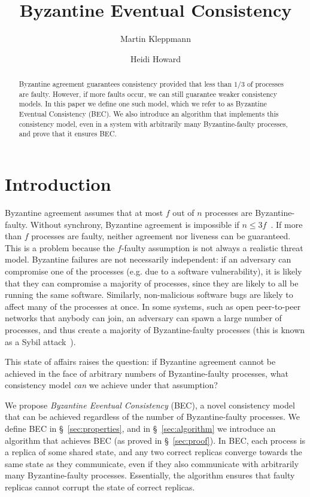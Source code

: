 \documentclass[a4paper,anonymous,USenglish]{lipics-v2019}
\title{Byzantine Eventual Consistency}
\author{Martin Kleppmann}{University of Cambridge}{mk428@cst.cam.ac.uk}{https://orcid.org/0000-0001-7252-6958}{Supported by a Leverhulme Trust Early Career Fellowship and by the Isaac Newton Trust.}
\author{Heidi Howard}{University of Cambridge}{hh360@cst.cam.ac.uk}{https://orcid.org/0000-0001-5256-7664}{}
\begin{document}
\maketitle
\begin{abstract}
    Byzantine agreement guarantees consistency provided that less than $1/3$ of processes are faulty.
    However, if more faults occur, we can still guarantee weaker consistency models. 
    In this paper we define one such model, which we refer to as Byzantine Eventual Consistency (BEC).
    We also introduce an algorithm that implements this consistency model, even in a system with arbitrarily many Byzantine-faulty processes, and prove that it ensures BEC.
\end{abstract}
\maketitle

\section{Introduction}

Byzantine agreement assumes that at most $f$ out of $n$ processes are Byzantine-faulty.
Without synchrony, Byzantine agreement is impossible if $n\leq3f$~\cite{Lamport:1982,Dwork:1988}.
If more than $f$ processes are faulty, neither agreement nor liveness can be guaranteed.
This is a problem because the $f$-faulty assumption is not always a realistic threat model.
Byzantine failures are not necessarily independent: if an adversary can compromise one of the processes (e.g. due to a software vulnerability), it is likely that they can compromise a majority of processes, since they are likely to all be running the same software. 
Similarly, non-malicious software bugs are likely to affect many of the processes at once.
In some systems, such as open peer-to-peer networks that anybody can join, an adversary can spawn a large number of processes, and thus create a majority of Byzantine-faulty processes (this is known as a Sybil attack~\cite{Douceur:2002}).

This state of affairs raises the question: if Byzantine agreement cannot be achieved in the face of arbitrary numbers of Byzantine-faulty processes, what consistency model \emph{can} we achieve under that assumption?

We propose \emph{Byzantine Eventual Consistency} (BEC), a novel consistency model that can be achieved regardless of the number of Byzantine-faulty processes.
We define BEC in \S~\ref{sec:properties}, and in \S~\ref{sec:algorithm} we introduce an algorithm that achieves BEC (as proved in \S~\ref{sec:proof}).
In BEC, each process is a replica of some shared state, and any two correct replicas converge towards the same state as they communicate, even if they also communicate with arbitrarily many Byzantine-faulty processes.
Essentially, the algorithm ensures that faulty replicas cannot corrupt the state of correct replicas.
\end{document}
